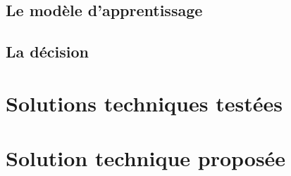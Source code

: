 \subsection{Le modèle d'apprentissage}
\label{Automatisation du processus d'investigation: Achitecture High Level du système proposé: Le modèle d'apprentissage}

\subsection{La décision}
\label{Automatisation du processus d'investigation: Achitecture High Level du système proposé: La décision}



\section{Solutions techniques testées}
\label{Automatisation du processus d'investigation: Solutions techniques testées}




\section{Solution technique proposée}
\label{Automatisation du processus d'investigation: Solution technique proposée}

